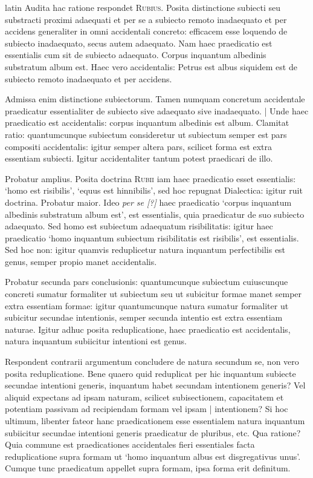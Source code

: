 \begin{otherlanguage*}{latin}
\pstart
  Audita hac ratione respondet \textsc{Rubius}. Posita distinctione subiecti seu substracti proximi adaequati et per se a subiecto remoto inadaequato et per accidens generaliter in omni accidentali concreto: efficacem esse loquendo de subiecto inadaequato, secus autem adaequato. Nam haec praedicatio est essentialis cum sit de subiecto adaequato. Corpus inquantum albedinis substratum album est. Haec vero accidentalis: Petrus est albus siquidem est de subiecto remoto inadaequato et per accidens. 
\pend

\pstart
  Admissa enim distinctione subiectorum. Tamen numquam concretum accidentale praedicatur essentialiter de subiecto sive adaequato sive inadaequato. \textnormal{|}   Unde haec praedicatio est accidentalis: corpus inquantum albedinis est album. Clamitat ratio: quantumcunque subiectum consideretur ut subiectum semper est pars compositi accidentalis: igitur semper altera pars, scilicet forma est extra essentiam subiecti. Igitur accidentaliter tantum potest praedicari de illo. 
\pend

\pstart
  Probatur amplius. Posita doctrina \textsc{Rubii} iam haec praedicatio esset essentialis: `homo est risibilis', `equus est hinnibilis', sed hoc repugnat Dialectica: igitur ruit doctrina. Probatur maior. Ideo \emph{per se [?]} haec praedicatio `corpus inquantum albedinis substratum album est', est essentialis, quia praedicatur de suo subiecto adaequato. Sed homo est subiectum adaequatum risibilitatis: igitur haec praedicatio `homo inquantum subiectum risibilitatis est risibilis', est essentialis. Sed hoc non: igitur quamvis reduplicetur natura inquantum perfectibilis est genus, semper propio manet accidentalis. 
\pend

\pstart
  Probatur secunda pars conclusionis: quantumcunque subiectum cuiuscunque concreti sumatur formaliter ut subiectum seu ut subicitur formae manet semper extra essentiam formae: igitur quantumcunque natura sumatur formaliter ut subicitur secundae intentionis, semper secunda intentio est extra essentiam naturae. Igitur adhuc posita reduplicatione, haec praedicatio est accidentalis, natura inquantum subiicitur intentioni est genus. 
\pend

\pstart
  Respondent contrarii argumentum concludere de natura secundum se, non vero posita reduplicatione. Bene quaero quid reduplicat per hic inquantum subiecte secundae intentioni generis, inquantum habet secundam intentionem generis? Vel aliquid expectans ad ipsam naturam, scilicet subisectionem, capacitatem et potentiam passivam ad recipiendam formam vel ipsam \textnormal{|} intentionem? Si hoc ultimum, libenter fateor hanc praedicationem esse essentialem natura inquantum subiicitur secundae intentioni generis praedicatur de pluribus, etc. Qua ratione? Quia commune est praedicationes accidentales fieri essentiales facta reduplicatione supra formam ut `homo inquantum albus est disgregativus unus'. Cumque tunc praedicatum appellet supra formam, ipsa forma erit definitum. 
\pend


\end{otherlanguage*}
